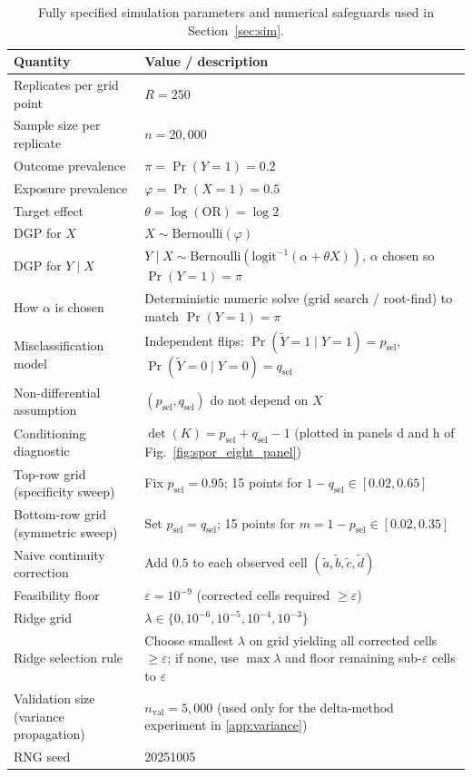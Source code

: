 \documentclass[pdflatex,sn-mathphys-num]{sn-jnl}%
\theoremstyle{thmstyleone}%
\theoremstyle{thmstyletwo}%
\theoremstyle{thmstylethree}%
\begin{document}
\begin{table}[t]
\centering
\caption{Fully specified simulation parameters and numerical safeguards used in Section~\ref{sec:sim}.}
\label{tab:sim_params}
\begin{tabular}{p{} p{}}
\hline
Quantity & Value / description \\
\hline
Replicates per grid point & \(R=250\) \\
Sample size per replicate & \(n=20{,}000\) \\
Outcome prevalence & \(\pi=\Pr(Y=1)=0.2\) \\
Exposure prevalence & \(\varphi=\Pr(X=1)=0.5\) \\
Target effect & \(\theta=\log(\mathrm{OR})=\log 2\) \\
DGP for \(X\) & \(X\sim\mathrm{Bernoulli}(\varphi)\) \\
DGP for \(Y\mid X\) &
\(Y\mid X\sim\mathrm{Bernoulli}(\mathrm{logit}^{-1}(\alpha+\theta X))\), \(\alpha\) chosen so \(\Pr(Y=1)=\pi\) \\
How \(\alpha\) is chosen &
Deterministic numeric solve (grid search / root-find) to match \(\Pr(Y=1)=\pi\) \\
Misclassification model &
Independent flips: \(\Pr(\tilde Y{=}1\mid Y{=}1)=p_{\mathrm{sel}}\), \(\Pr(\tilde Y{=}0\mid Y{=}0)=q_{\mathrm{sel}}\) \\
Non-differential assumption &
\((p_{\mathrm{sel}},q_{\mathrm{sel}})\) do not depend on \(X\) \\
Conditioning diagnostic &
\(\det(K)=p_{\mathrm{sel}}+q_{\mathrm{sel}}-1\) (plotted in panels d and h of Fig.~\ref{fig:spor_eight_panel}) \\
Top-row grid (specificity sweep) &
Fix \(p_{\mathrm{sel}}=0.95\); 15 points for \(1-q_{\mathrm{sel}}\in[0.02,0.65]\) \\
Bottom-row grid (symmetric sweep) &
Set \(p_{\mathrm{sel}}=q_{\mathrm{sel}}\); 15 points for \(m=1-p_{\mathrm{sel}}\in[0.02,0.35]\) \\
Naive continuity correction &
Add \(0.5\) to each observed cell \((\tilde a,\tilde b,\tilde c,\tilde d)\) \\
Feasibility floor &
\(\varepsilon=10^{-9}\) (corrected cells required \(\ge \varepsilon\)) \\
Ridge grid &
\(\lambda\in\{0,10^{-6},10^{-5},10^{-4},10^{-3}\}\) \\
Ridge selection rule &
Choose smallest \(\lambda\) on grid yielding all corrected cells \(\ge\varepsilon\);
if none, use \(\max\lambda\) and floor remaining sub-\(\varepsilon\) cells to \(\varepsilon\) \\
Validation size (variance propagation) &
\(n_{\mathrm{val}}=5{,}000\) (used only for the delta-method experiment in \ref{app:variance}) \\
RNG seed & 20251005 \\
\hline
\end{tabular}
\end{table}
\end{document}
